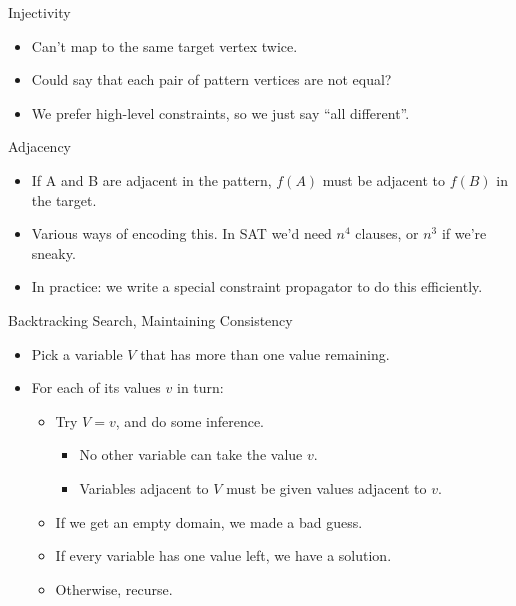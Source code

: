 \documentclass[aspectratio=169,compress,10pt]{beamer}
\begin{document}
\begin{frame}{Injectivity}
    \begin{itemize}
        \item Can't map to the same target vertex twice.
        \item Could say that each pair of pattern vertices are not equal?
        \item <2-> We prefer high-level constraints, so we just say ``all different''.
    \end{itemize}
\end{frame}

\begin{frame}{Adjacency}
    \begin{itemize}
        \item If A and B are adjacent in the pattern, $f(A)$ must be adjacent to $f(B)$
            in the target.
        \item Various ways of encoding this. In SAT we'd need $n^4$ clauses, or $n^3$ if
            we're sneaky.
        \item In practice: we write a special constraint propagator to do this efficiently.
    \end{itemize}
\end{frame}

\begin{frame}{Backtracking Search, Maintaining Consistency}
    \begin{itemize}
        \item Pick a variable $V$ that has more than one value remaining.
        \item For each of its values $v$ in turn:
            \begin{itemize}
                \item Try $V = v$, and do some inference.
                    \begin{itemize}
                        \item No other variable can take the value $v$.
                        \item Variables adjacent to $V$ must be given values adjacent to $v$.
                    \end{itemize}
                \item If we get an empty domain, we made a bad guess.
                \item If every variable has one value left, we have a solution.
                \item Otherwise, recurse.
            \end{itemize}
    \end{itemize}
\end{frame}
\end{document}
